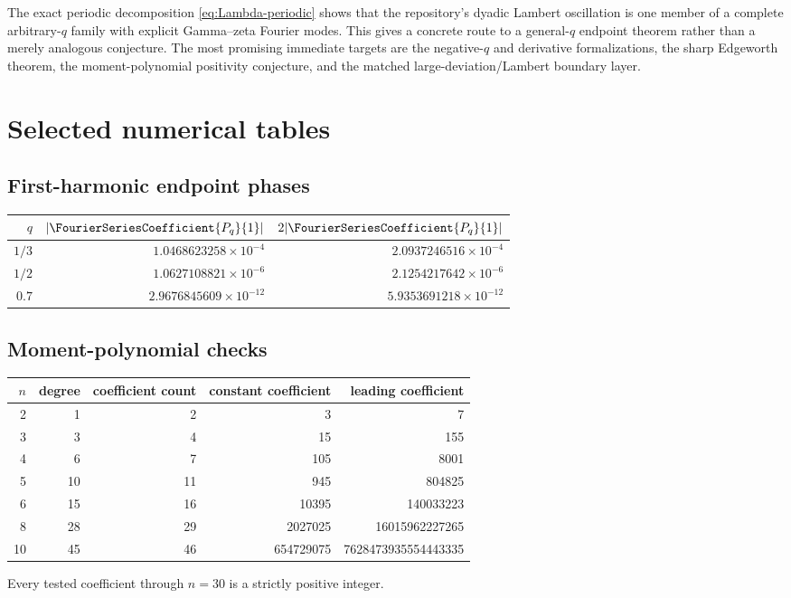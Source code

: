 \documentclass[11pt,oneside]{article}
\theoremstyle{definition}
\theoremstyle{remark}
\begin{document}
The exact periodic decomposition \cref{eq:Lambda-periodic} shows that the repository's dyadic Lambert oscillation is one member of a complete arbitrary-$q$ family with explicit Gamma--zeta Fourier modes.  This gives a concrete route to a general-$q$ endpoint theorem rather than a merely analogous conjecture.  The most promising immediate targets are the negative-$q$ and derivative formalizations, the sharp Edgeworth theorem, the moment-polynomial positivity conjecture, and the matched large-deviation/Lambert boundary layer.

\appendix

\section{Selected numerical tables}

\subsection{First-harmonic endpoint phases}

\begin{center}
\begin{tabular}{rrr}
\toprule
$q$ & $|\FourierSeriesCoefficient{P_q}{1}|$ & $2|\FourierSeriesCoefficient{P_q}{1}|$\\
\midrule
$1/3$ & $1.0468623258\times10^{-4}$ & $2.0937246516\times10^{-4}$\\
$1/2$ & $1.0627108821\times10^{-6}$ & $2.1254217642\times10^{-6}$\\
$0.7$ & $2.9676845609\times10^{-12}$ & $5.9353691218\times10^{-12}$\\
\bottomrule
\end{tabular}
\end{center}

\subsection{Moment-polynomial checks}

\begin{center}
\begin{tabular}{rrrrr}
\toprule
$n$ & degree & coefficient count & constant coefficient & leading coefficient\\
\midrule
2 & 1 & 2 & 3 & 7\\
3 & 3 & 4 & 15 & 155\\
4 & 6 & 7 & 105 & 8001\\
5 & 10 & 11 & 945 & 804825\\
6 & 15 & 16 & 10395 & 140033223\\
8 & 28 & 29 & 2027025 & 16015962227265\\
10 & 45 & 46 & 654729075 & 7628473935554443335\\
\bottomrule
\end{tabular}
\end{center}
Every tested coefficient through $n=30$ is a strictly positive integer.
\end{document}

